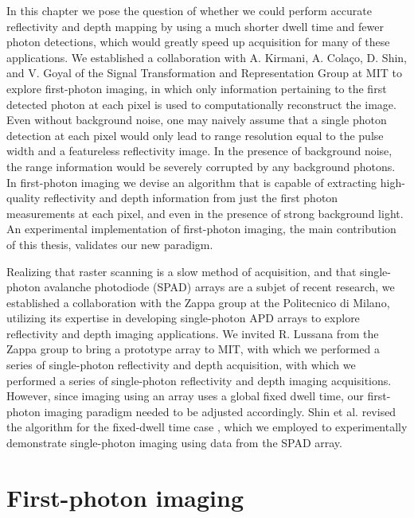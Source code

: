 In this chapter we pose the question of whether we could perform accurate reflectivity and depth mapping by using a much shorter dwell time and fewer photon detections, which would greatly speed up acquisition for many of these applications. We established a collaboration with A. Kirmani, A. Cola\c{c}o, D. Shin, and V. Goyal of the Signal Transformation and Representation Group at MIT to explore first-photon imaging, in which only information pertaining to the first detected photon at each pixel is used to computationally reconstruct the image. Even without background noise, one may naively assume that a single photon detection at each pixel would only lead to range resolution equal to the pulse width and a featureless reflectivity image. In the presence of background noise, the range information would be severely corrupted by any background photons. In first-photon imaging we devise an algorithm that is capable of extracting high-quality reflectivity and depth information from just the first photon measurements at each pixel, and even in the presence of strong background light. An experimental implementation of first-photon imaging, the main contribution of this thesis, validates our new paradigm.

Realizing that raster scanning is a slow method of acquisition, and that single-photon avalanche photodiode (SPAD) arrays are a subjet of recent research, we established a collaboration with the Zappa group at the Politecnico di Milano, utilizing its expertise in developing single-photon APD arrays \cite{villa-spad,guerrieri-two,scarcella-low} to explore reflectivity and depth imaging applications. We invited R. Lussana from the Zappa group to bring a prototype array to MIT, with which we performed a series of single-photon reflectivity and depth acquisition, with which we performed a series of single-photon reflectivity and depth imaging acquisitions. However, since imaging using an array uses a global fixed dwell time, our first-photon imaging paradigm needed to be adjusted accordingly. Shin et al. revised the algorithm for the fixed-dwell time case \cite{kirmani-photon}, which we employed to experimentally demonstrate single-photon imaging using data from the SPAD array.

\section{First-photon imaging}

